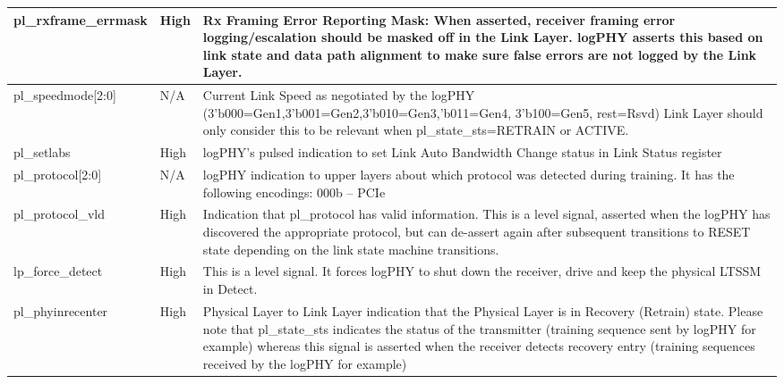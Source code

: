 \begin{table}[H]
\begin{tabular}{ |m{26mm}|P{18mm}|m{60mm}|  }
\\ \hline
\end{tabular}
\end{table}


\begin{table}[H]

    \centering
  \begin{tabular}{ |P{30mm}|P{18mm}|m{63mm}|  }
  \hline
pl\_rxframe\_errmask & High & Rx Framing Error Reporting Mask:
When asserted, receiver framing error logging/escalation should be masked off in the
Link Layer. logPHY asserts this based on link state and data path alignment to make
sure false errors are not logged by the Link Layer.
\\ \hline
pl\_speedmode[2:0] & N/A & Current Link Speed as negotiated by the logPHY
(3’b000=Gen1,3’b001=Gen2,3’b010=Gen3,’b011=Gen4, 3’b100=Gen5, rest=Rsvd)
Link Layer should only consider this to be relevant when pl\_state\_sts=RETRAIN or
ACTIVE. \\ \hline
pl\_setlabs & High & logPHY’s pulsed indication to set Link Auto Bandwidth Change status in Link Status register \\ \hline
pl\_protocol[2:0] & N/A & logPHY indication to upper layers about which protocol was detected during training. It
has the following encodings: \newline
000b – PCIe \\ \hline
pl\_protocol\_vld & High & 
Indication that pl\_protocol has valid information. This is a level signal, asserted when
the logPHY has discovered the appropriate protocol, but can de-assert again after
subsequent transitions to RESET state depending on the link state machine transitions. \\ \hline
lp\_force\_detect & High & This is a level signal. It forces logPHY to shut down the receiver, drive and keep the
physical LTSSM in Detect. \\ \hline
pl\_phyinrecenter & High & Physical Layer to Link Layer indication that the Physical Layer is in Recovery (Retrain)
state. Please note that pl\_state\_sts indicates the status of the transmitter (training
sequence sent by logPHY for example) whereas this signal is asserted when the receiver
detects recovery entry (training sequences received by the logPHY for example) \\ \hline
\end{tabular}
\end{table}

